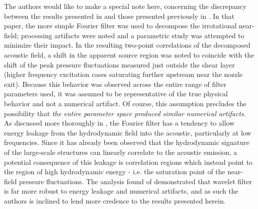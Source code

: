 The authors would like to make a special note here, concerning the discrepancy between the results presented in  and those presented previously in \citet{Crawley2015}.
In that paper, the more simple Fourier filter was used to decompose the irrotational near-field; processing artifacts were noted and a parametric study was attempted to minimize their impact.
In the resulting two-point correlations of the decomposed acoustic field, a shift in the apparent source region was noted to coincide with the shift of the peak pressure fluctuations measured just outside the shear layer (higher frequency excitation cases saturating further upstream near the nozzle exit).
Because this behavior was observed across the entire range of filter parameters used, it was assumed to be representative of the true physical behavior and not a numerical artifact.
Of course, this assumption precludes the possibility that \textit{the entire parameter space produced similar numerical artifacts}. 
As discussed more thoroughly in \citet{Crawley2016}, the Fourier filter has a tendency to allow energy leakage from the hydrodynamic field into the acoustic, particularly at low frequencies. 
Since it has already been observed that the hydrodynamic signature of the large-scale structures can linearly correlate to the acoustic emission, a potential consequence of this leakage is correlation regions which instead point to the region of high hydrodynamic energy - i.e. the saturation point of the near-field pressure fluctuations.
The analysis found of \citet{Crawley2016} demonstrated that wavelet filter is far more robust to energy leakage and numerical artifacts, and as such the authors is inclined to lend more credence to the results presented herein. 